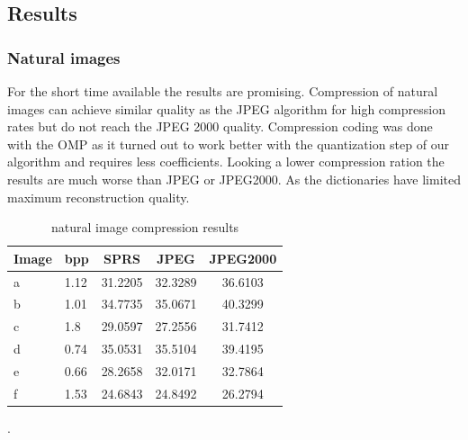 \subsection{Results}
\subsubsection{Natural images}

For the short time available the results are promising. Compression of
natural images can achieve similar quality as the JPEG algorithm
 for high compression rates but do not reach the
JPEG 2000 quality. Compression coding was done with the OMP as it turned out to
work better with the quantization step of our algorithm and requires less
coefficients. Looking a lower compression ration the results are much worse than
JPEG or JPEG2000. As the dictionaries have limited maximum reconstruction
quality.

\begin{table}[h]
\centering

\begin{tabular}{| l l | c | c | c|}
\hline\hline
Image & bpp & SPRS & JPEG & JPEG2000 \\
\hline
a & 1.12 & 31.2205 & 32.3289 & 36.6103 \\
\hline
b & 1.01 & 34.7735 & 35.0671 & 40.3299 \\
\hline
c & 1.8  & 29.0597 & 27.2556 & 31.7412 \\
\hline
d & 0.74 & 35.0531 & 35.5104 & 39.4195 \\
\hline
e & 0.66 & 28.2658 & 32.0171 & 32.7864 \\
\hline
f & 1.53 & 24.6843  & 24.8492 & 26.2794 \\
\hline
\end{tabular}
\caption{natural image compression results}
\label{tab:compression1}.
\end{table} 

